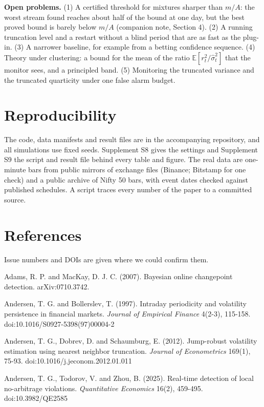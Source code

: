 \documentclass[
]{article}
\begin{document}
\textbf{Open problems.} (1) A certified threshold for mixtures sharper
than \(m/A\): the worst stream found reaches about half of the bound at
one day, but the best proved bound is barely below \(m/A\) (companion
note, Section 4). (2) A running truncation level and a restart without a
blind period that are as fast as the plug-in. (3) A narrower baseline,
for example from a betting confidence sequence. (4) Theory under
clustering: a bound for the mean of the ratio
\(\mathbb{E}[r_t^2/\hat\sigma_t^2]\) that the monitor sees, and a
principled band. (5) Monitoring the truncated variance and the truncated
quarticity under one false alarm budget.

\hypertarget{reproducibility}{%
\section{Reproducibility}\label{reproducibility}}

The code, data manifests and result files are in the accompanying
repository, and all simulations use fixed seeds. Supplement S8 gives the
settings and Supplement S9 the script and result file behind every table
and figure. The real data are one-minute bars from public mirrors of
exchange files (Binance; Bitstamp for one check) and a public archive of
Nifty 50 bars, with event dates checked against published schedules. A
script traces every number of the paper to a committed source.

\hypertarget{references}{%
\section{References}\label{references}}

Issue numbers and DOIs are given where we could confirm them.

Adams, R. P. and MacKay, D. J. C. (2007). Bayesian online changepoint
detection. arXiv:0710.3742.

Andersen, T. G. and Bollerslev, T. (1997). Intraday periodicity and
volatility persistence in financial markets. \emph{Journal of Empirical
Finance} 4(2-3), 115-158. doi:10.1016/S0927-5398(97)00004-2

Andersen, T. G., Dobrev, D. and Schaumburg, E. (2012). Jump-robust
volatility estimation using nearest neighbor truncation. \emph{Journal
of Econometrics} 169(1), 75-93. doi:10.1016/j.jeconom.2012.01.011

Andersen, T. G., Todorov, V. and Zhou, B. (2025). Real-time detection of
local no-arbitrage violations. \emph{Quantitative Economics} 16(2),
459-495. doi:10.3982/QE2585
\end{document}
